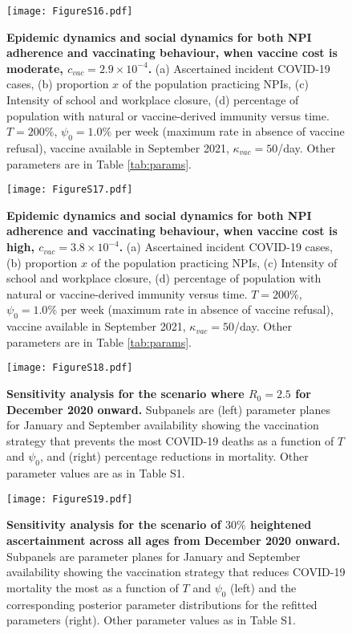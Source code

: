 \documentclass[10pt,onecolumn,twoside,lineno]{pnas-new}
\begin{document}
\clearpage 

\begin{figure}[H]
\centering
\texttt{[image: FigureS16.pdf]}
\caption{\textbf{Epidemic dynamics and social dynamics for both NPI adherence and vaccinating behaviour, when vaccine cost is moderate, $c_{vac}=2.9\times 10^{-4}$.} (a) Ascertained incident COVID-19 cases, (b) proportion $x$ of the population practicing NPIs, (c) Intensity of school and workplace closure, (d) percentage of population with natural or vaccine-derived immunity versus time. $T=200 \%$, $\psi_0=1.0 \%$ per week (maximum rate in absence of vaccine refusal), vaccine available in September 2021, $\kappa_{vac}=50$/day.   Other parameters are in Table \ref{tab:params}.}
\label{plot_model}
\end{figure}

\clearpage 

\begin{figure}[H]
\centering
\texttt{[image: FigureS17.pdf]}
\caption{\textbf{Epidemic dynamics and social dynamics for both NPI adherence and vaccinating behaviour, when vaccine cost is high, $c_{vac}=3.8\times 10^{-4}$.} (a) Ascertained incident COVID-19 cases, (b) proportion $x$ of the population practicing NPIs, (c) Intensity of school and workplace closure, (d) percentage of population with natural or vaccine-derived immunity versus time. $T=200 \%$, $\psi_0=1.0 \%$ per week (maximum rate in absence of vaccine refusal), vaccine available in September 2021, $\kappa_{vac}=50$/day. Other parameters are in Table \ref{tab:params}.}
\label{plot_model}
\end{figure}

\clearpage 

\begin{figure}[H]
\centering
\texttt{[image: FigureS18.pdf]}
\caption{\textbf{Sensitivity analysis for the scenario where $R_0=2.5$ for December 2020 onward.} Subpanels are (left) parameter planes for January and September availability showing the vaccination strategy that prevents the most COVID-19 deaths as a function of $T$ and $\psi_0$, and (right) percentage reductions in mortality. Other parameter values are as in Table S1.}
\label{plot_model}
\end{figure}

\clearpage 

\begin{figure}[H]
\centering
\texttt{[image: FigureS19.pdf]}
\caption{\textbf{Sensitivity analysis for the scenario of $30 \%$ heightened ascertainment across all ages from December 2020 onward.} Subpanels are parameter planes for January and September availability showing the vaccination strategy that reduces COVID-19 mortality the most as a function of $T$ and $\psi_0$ (left) and the corresponding posterior parameter distributions for the refitted parameters (right).  Other parameter values as in Table S1.}
\label{plot_model}
\end{figure}
\end{document}
